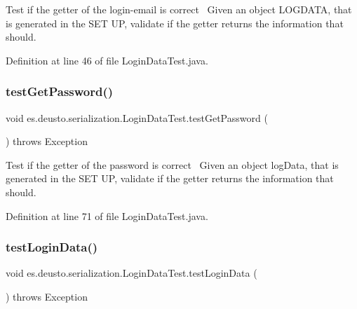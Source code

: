 Test if the getter of the login-\/email is correct~\newline
Given an object L\+O\+G\+D\+A\+TA, that is generated in the S\+ET UP, validate if the getter returns the information that should. 

Definition at line 46 of file Login\+Data\+Test.\+java.

\mbox{\label{classes_1_1deusto_1_1serialization_1_1_login_data_test_a7686b5fb1a89b9e0a5e8fa20dfc0fdee}} 
\subsubsection{\texorpdfstring{test\+Get\+Password()}{testGetPassword()}}
{\footnotesize\ttfamily void es.\+deusto.\+serialization.\+Login\+Data\+Test.\+test\+Get\+Password (\begin{DoxyParamCaption}{ }\end{DoxyParamCaption}) throws Exception}

Test if the getter of the password is correct~\newline
Given an object log\+Data, that is generated in the S\+ET UP, validate if the getter returns the information that should. 

Definition at line 71 of file Login\+Data\+Test.\+java.

\mbox{\label{classes_1_1deusto_1_1serialization_1_1_login_data_test_a74ecd0b9656b109638fc4949d589dc81}} 
\subsubsection{\texorpdfstring{test\+Login\+Data()}{testLoginData()}}
{\footnotesize\ttfamily void es.\+deusto.\+serialization.\+Login\+Data\+Test.\+test\+Login\+Data (\begin{DoxyParamCaption}{ }\end{DoxyParamCaption}) throws Exception}

